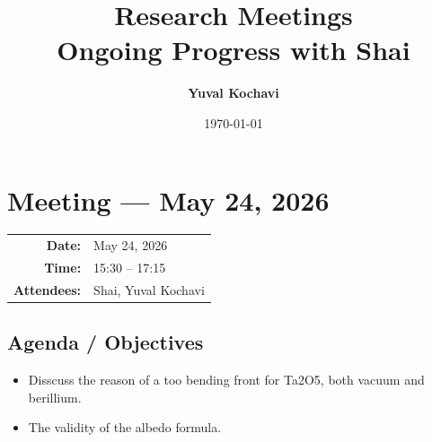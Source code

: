 \documentclass[11pt,a4paper]{article}
\title{
    \vspace{-1.5in}
    \huge \bfseries \color{PrimaryColor} Research Meetings \\
    \large \vspace{0.2in} \color{SecondaryColor} Ongoing Progress with Shai
}
\author{\textbf{Yuval Kochavi}}
\date{\today}
\newcommand{\meetingmeta}[3]{
    \noindent
    \colorbox{LightBg}{
        \begin{minipage}{\dimexpr\textwidth-2\fboxsep\relax}
            \vspace{0.5em}
            \hspace{0.5em}
            \begin{tabular}{r l}
                \textbf{Date:} & #1 \\
                \textbf{Time:} & #2 \\
                \textbf{Attendees:} & #3
            \end{tabular}
            \vspace{0.5em}
        \end{minipage}
    }
    \vspace{1em}
}
\begin{document}
\maketitle


\vspace{1em}
\tableofcontents
\newpage

\section{Meeting --- May 24, 2026}
\meetingmeta{May 24, 2026}{15:30 -- 17:15}{Shai, Yuval Kochavi}

\subsection{Agenda / Objectives}
\begin{itemize}
    \item Disscuss the reason of a too bending front for Ta2O5, both vacuum and berillium.
    \item The validity of the albedo formula.
\end{itemize}
\end{document}
